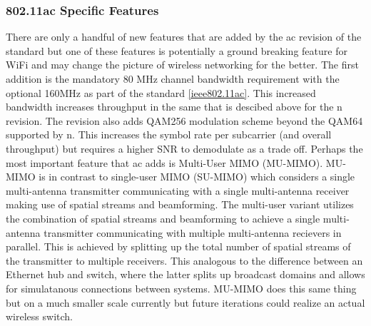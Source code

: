 \subsubsection{802.11ac Specific Features}

There are only a handful of new features that are added by the ac revision of the standard but one of these features is potentially a ground breaking feature for WiFi and may change the picture of wireless networking for the better. The first addition is the mandatory 80 MHz channel bandwidth requirement with the optional 160MHz as part of the standard \ref{ieee802.11ac}. This increased bandwidth increases throughput in the same that is descibed above for the n revision. The revision also adds QAM256 modulation scheme beyond the QAM64 supported by n. This increases the symbol rate per subcarrier (and overall throughput) but requires a higher SNR to demodulate as a trade off. Perhaps the most important feature that ac adds is Multi-User MIMO (MU-MIMO). MU-MIMO is in contrast to single-user MIMO (SU-MIMO) which considers a single multi-antenna transmitter communicating with a single multi-antenna receiver making use of spatial streams and beamforming. The multi-user variant utilizes the combination of spatial streams and beamforming to achieve a single multi-antenna transmitter communicating with multiple multi-antenna recievers in parallel. This is achieved by splitting up the total number of spatial streams of the transmitter to multiple receivers. This analogous to the difference between an Ethernet hub and switch, where the latter splits up broadcast domains and allows for simulatanous connections between systems. MU-MIMO does this same thing but on a much smaller scale currently but future iterations could realize an actual wireless switch.
